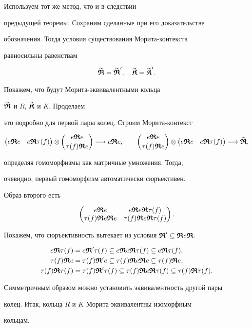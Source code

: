 \begin{pf} Используем тот же метод, что и в следствии


предыдущей теоремы. Сохраним сделанные при его доказательстве


обозначения. Тогда условия существования Морита-контекста


равносильны равенствам


$$


\widetilde{\R}=\widetilde{\R}', \quad


\widetilde{\K}=\widetilde{\K}'.


$$


Покажем, что будут Морита-эквивалентными кольца


$\widetilde{\boldsymbol{\frak R}}$ и $R$, $\widetilde{\boldsymbol{\frak K}}$ и $K$. Проделаем


это подробно для первой пары колец. Строим Морита-контекст


$$


\row{e\R e}{e\R\t(f)} \otimes \colmn{e\R e}{\t(f)\R e}


\longrightarrow e\R e, \qquad


\colmn{e\R e}{\t(f)\R e} \otimes \row{e\R e}{e\R\t(f)}


\longrightarrow \widetilde{\R},


$$


определяя гомоморфизмы как матричные умножения. Тогда,


очевидно, первый гомоморфизм автоматически сюръективен.


Образ второго есть


$$


\mat{e\R e}{e\R e \R \t(f)}{\t(f)\R e \R e}{\t(f)\R e \R \t(f)}.


$$


Покажем, что сюръективность вытекает из условия $\boldsymbol{\frak R}' \subseteq\boldsymbol{\frak R} e \boldsymbol{\frak R}$.


\begin{align*}


e\R \t(f) &= e\R'\t(f)\subseteq e\R e\R \t(f) \subseteq e \R \t(f),\\


%


\t(f)\R e &= \t(f)\R'e \subseteq \t(f)\R e\R e \subseteq \t(f)\R e,\\


%


\t(f)\R\t(f) &= \t(f)\R'\t(f) \subseteq \t(f)\R e\R \t(f)


\subseteq \t(f)\R\t(f).


\end{align*}


Симметричным образом можно установить эквивалентность другой пары


колец. Итак, кольца $R$ и $K$ Морита-эквивалентны изоморфным


кольцам.


\end{pf}








